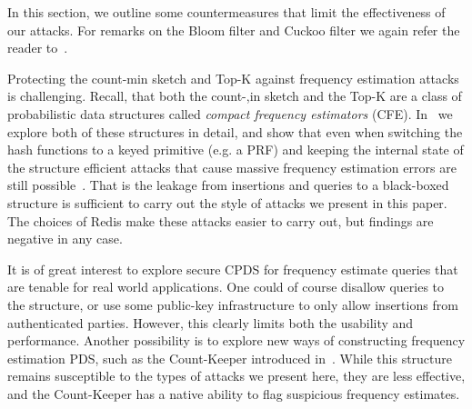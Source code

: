 In this section, we outline some countermeasures that limit the effectiveness of our attacks. For remarks on the Bloom filter and Cuckoo filter we again refer the reader to~\cite{cryptoeprint:2024/1312}.

Protecting the count-min sketch and Top-K against frequency estimation attacks is challenging. Recall, that both the count-,in sketch and the Top-K are a class of probabilistic data structures called \emph{compact frequency estimators} (CFE). In~ we explore both of these structures in detail, and show that even when switching the hash functions to a keyed primitive (e.g. a PRF) and keeping the internal state of the structure efficient attacks that cause massive frequency estimation errors are still possible~\cite{markelon23}. That is the leakage from insertions and queries to a black-boxed structure is sufficient to carry out the style of attacks we present in this paper. The choices of Redis make these attacks easier to carry out, but findings are negative in any case. 

It is of great interest to explore secure CPDS for frequency estimate queries that are tenable for real world applications. One could of course disallow queries to the structure, or use some public-key infrastructure to only allow insertions from authenticated parties. However, this clearly limits both the usability and performance. Another possibility is to explore new ways of constructing frequency estimation PDS, such as the Count-Keeper introduced in~\cite{markelon23}. While this structure remains susceptible to the types of attacks we present here, they are less effective, and the Count-Keeper has a native ability to flag suspicious frequency estimates. 


